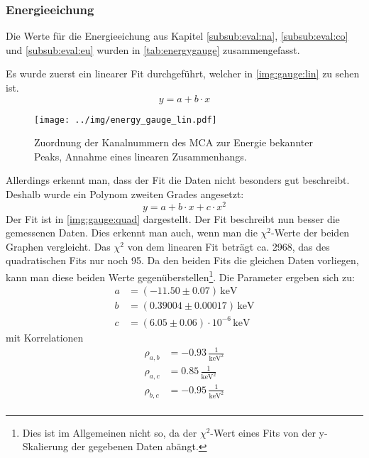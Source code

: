 \subsubsection{Energieeichung}
Die Werte für die Energieeichung aus Kapitel \ref{subsub:eval:na}, \ref{subsub:eval:co} und \ref{subsub:eval:eu} wurden in 
\autoref{tab:energygauge} zusammengefasst.

Es wurde zuerst ein linearer Fit durchgeführt, welcher in \autoref{img:gauge:lin} zu sehen ist.
\begin{equation}
  y = a + b\cdot x
\end{equation}
\label{subsub:energygauge}
\begin{figure}[H]
\begin{center}
  \texttt{[image: ../img/energy\_gauge\_lin.pdf]}
  \caption{Zuordnung der Kanalnummern des MCA zur Energie bekannter Peaks,
  Annahme eines linearen Zusammenhangs.}
  \label{img:gauge:lin}
\end{center}
\end{figure}
Allerdings erkennt man, dass der Fit die Daten nicht besonders gut beschreibt. Deshalb wurde ein Polynom zweiten Grades angesetzt:
\begin{equation}
  y = a + b\cdot x + c\cdot x^2
\end{equation}
Der Fit ist in \autoref{img:gauge:quad} dargestellt. Der Fit beschreibt nun besser die gemessenen Daten. Dies erkennt man auch, 
wenn man die $\chi^2$-Werte der beiden Graphen vergleicht. Das $\chi^2$ von dem linearen Fit beträgt ca. 2968, das des quadratischen Fits 
nur noch 95. Da den beiden Fits die gleichen Daten vorliegen, kann man diese beiden Werte gegenüberstellen\footnote{Dies ist im Allgemeinen nicht so,
da der $\chi^2$-Wert eines Fits von der y-Skalierung der gegebenen Daten abängt.}.
Die Parameter ergeben sich zu:
\begin{equation}
\begin{split}
  \label{eq:energygauge:params}
  a &= (-11.50 \pm 0.07) \,\text{keV} \\
  b &= (0.39004 \pm 0.00017) \,\text{keV} \\
  c &= (6.05 \pm 0.06) \cdot 10^{-6} \,\text{keV}
\end{split}
\end{equation}
mit Korrelationen
\begin{equation}
\begin{split}
  \label{eq:energygauge:corr}
  \rho_{a, b} &= -0.93 \, \frac{1}{\text{keV}^2} \\
  \rho_{a, c} &=  0.85 \, \frac{1}{\text{keV}^2} \\
  \rho_{b, c} &= -0.95 \, \frac{1}{\text{keV}^2} \\
\end{split}
\end{equation}
